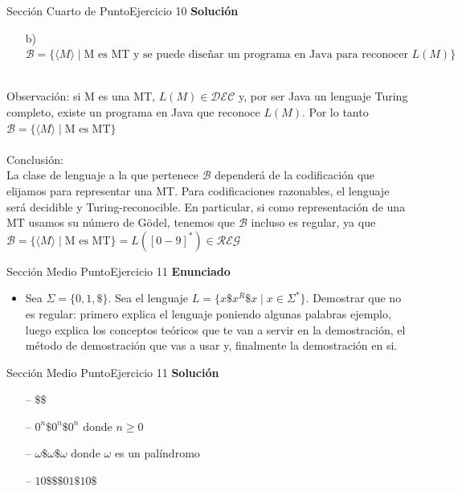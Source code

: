 \documentclass[10pt, envcountsect, presentation, aspectratio=169]{beamer}
\begin{document}

\begin{frame}{Sección Cuarto de Punto}{Ejercicio 10}
    \textbf{Solución}\\
    \begin{itemize}
        \item[b)] $\mathcal{B} = \{\langle M \rangle \mid \mbox{M es MT  y  se puede diseñar un programa en Java para reconocer } L(M)\}$\\~\\
    \end{itemize}
    Observación: si M es una MT, $L(M) \in \mathcal{DEC}$ y, por ser Java un lenguaje Turing completo, existe un programa en Java que reconoce $L(M)$. Por lo tanto $\mathcal{B} = \{\langle M \rangle \mid \mbox{M es MT}\}$ \\~\\
    

    Conclusión:\\
    La clase de lenguaje a la que pertenece $\mathcal{B}$ dependerá de la codificación que elijamos para representar una MT. Para codificaciones razonables, el lenguaje será decidible y Turing-reconocible. En particular, si como representación de una MT usamos su número de Gödel, tenemos que $\mathcal{B}$ incluso es regular, ya que $\mathcal{B} = \{\langle M \rangle \mid \mbox{M es MT}\} = L([0-9]^*) \in \mathcal{REG}$
\end{frame}


\begin{frame}{Sección Medio Punto}{Ejercicio 11}
    \textbf{Enunciado}
    \begin{itemize}
        \item Sea $\Sigma=\{0,1,\$\}$. Sea el lenguaje $L=\{x\$x^R\$x \mid x \in \Sigma^*\}$. Demostrar que no es regular: primero explica el lenguaje poniendo algunas palabras ejemplo, luego explica los conceptos teóricos que te van a servir en la demostración, el método de demostración que vas a usar y, finalmente la demostración en si.
    \end{itemize}
\end{frame}


\begin{frame}{Sección Medio Punto}{Ejercicio 11}
    \textbf{Solución}\\
    \begin{itemize}
        \item[--] $\$\$$
        \item[--] $0^n \$ 0^n \$ 0^n \text{ donde } n \geq 0$
        \item[--] $ \omega \$ \omega \$ \omega \text{ donde } \omega$ es un palíndromo 
        \item[--] $10\$ \$ \$01 \$ 10\$$  
    \end{itemize}
\end{frame}
\end{document}
